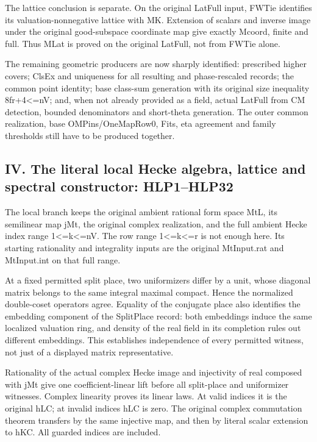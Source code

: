 The lattice conclusion is separate. On the original LatFull input, FWTie identifies its valuation-nonnegative lattice with MK. Extension of scalars and inverse image under the original good-subspace coordinate map give exactly Mcoord, finite and full. Thus MLat is proved on the original LatFull, not from FWTie alone.

The remaining geometric producers are now sharply identified: prescribed higher covers; ClsEx and uniqueness for all resulting and phase-rescaled records; the common point identity; base class-sum generation with its original size inequality 8fr+4<=nV; and, when not already provided as a field, actual LatFull from CM detection, bounded denominators and short-theta generation. The outer common realization, base OMPins/\allowbreak{}OneMapRow0, Fits, eta agreement and family thresholds still have to be produced together.

\subsection{IV. The literal local Hecke algebra, lattice and spectral constructor: HLP1–HLP32}

The local branch keeps the original ambient rational form space MtL, its semilinear map jMt, the original complex realization, and the full ambient Hecke index range 1<=k<=nV. The row range 1<=k<=r is not enough here. Its starting rationality and integrality inputs are the original MtInput.rat and MtInput.int on that full range.

At a fixed permitted split place, two uniformizers differ by a unit, whose diagonal matrix belongs to the same integral maximal compact. Hence the normalized double-coset operators agree. Equality of the conjugate place also identifies the embedding component of the SplitPlace record: both embeddings induce the same localized valuation ring, and density of the real field in its completion rules out different embeddings. This establishes independence of every permitted witness, not just of a displayed matrix representative.

Rationality of the actual complex Hecke image and injectivity of real composed with jMt give one coefficient-linear lift before all split-place and uniformizer witnesses. Complex linearity proves its linear laws. At valid indices it is the original hLC; at invalid indices hLC is zero. The original complex commutation theorem transfers by the same injective map, and then by literal scalar extension to hKC. All guarded indices are included.

